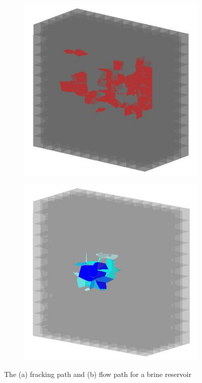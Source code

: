 \begin{figure}[!ht]
\begin{subfigure}[c]{0.48\textwidth}
\includegraphics[width=1\textwidth]{figures/Amir_ME4_Brine_Frack.png}
\subcaption{}
\label{fig:Amir_ME4_Brine_Frack}
\end{subfigure}
\hfill
\begin{subfigure}[c]{0.48\textwidth}
\includegraphics[width=1\textwidth]{figures/Amir_ME4_Brine_Flow.png}
\subcaption{}
\label{fig:Amir_ME4_Brine_Flow}
\end{subfigure}
\caption{The (a) fracking path and (b) flow path for a brine reservoir}
\end{figure}

